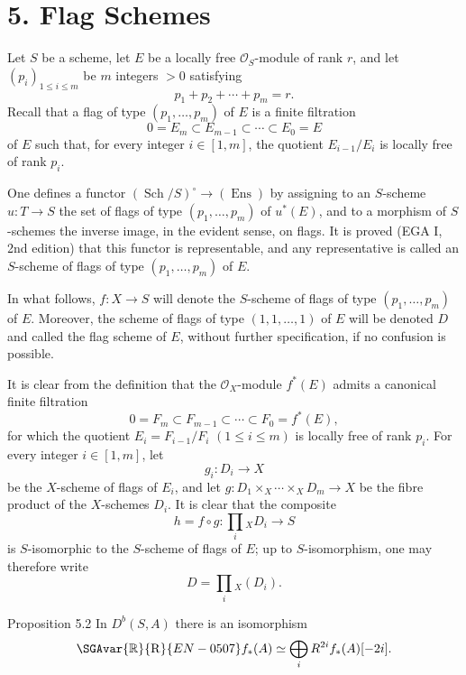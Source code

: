 \section*{5. Flag Schemes}

Let $S$ be a scheme, let $E$ be a locally free $\mathcal O_S$-module of rank $r$, and let $(p_i)_{1\le i\le m}$ be $m$ integers $>0$ satisfying
\[
p_1+p_2+\cdots+p_m=r.
\]
Recall that a flag of type $(p_1,\ldots,p_m)$ of $E$ is a finite filtration
\[
0=E_m\subset E_{m-1}\subset\cdots\subset E_0=E
\]
of $E$ such that, for every integer $i\in[1,m]$, the quotient $E_{i-1}/E_i$ is locally free of rank $p_i$.

One defines a functor $(\operatorname{Sch}/S)^\circ\to(\operatorname{Ens})$ by assigning to an $S$-scheme $u:T\to S$ the set of flags of type $(p_1,\ldots,p_m)$ of $u^*(E)$, and to a morphism of $S$-schemes the inverse image, in the evident sense, on flags. It is proved (EGA I, 2nd edition) that this functor is representable, and any representative is called an $S$-scheme of flags of type $(p_1,\ldots,p_m)$ of $E$.

In what follows, $f:X\to S$ will denote the $S$-scheme of flags of type $(p_1,\ldots,p_m)$ of $E$. Moreover, the scheme of flags of type $(1,1,\ldots,1)$ of $E$ will be denoted $D$ and called the flag scheme of $E$, without further specification, if no confusion is possible.

It is clear from the definition that the $\mathcal O_X$-module $f^*(E)$ admits a canonical finite filtration
\[
0=F_m\subset F_{m-1}\subset\cdots\subset F_0=f^*(E),
\]
for which the quotient $E_i=F_{i-1}/F_i$ $(1\le i\le m)$ is locally free of rank $p_i$. For every integer $i\in[1,m]$, let
\[
g_i:D_i\to X
\]
be the $X$-scheme of flags of $E_i$, and let $g:D_1\times_X\cdots\times_X D_m\to X$ be the fibre product of the $X$-schemes $D_i$. It is clear that the composite
\[
h=f\circ g:\prod_i{}_XD_i\to S
\tag{5.1}
\]
is $S$-isomorphic to the $S$-scheme of flags of $E$; up to $S$-isomorphism, one may therefore write
\[
D=\prod_i{}_X(D_i).
\]

\begin{statement}{Proposition 5.2}
In $D^b(S,A)$ there is an isomorphism
\[
\SGAvar{\mathbb{R}}{\mathrm R}{EN-0507}f_*(A)\simeq\bigoplus_i R^{2i}f_*(A)[-2i].
\]
\end{statement}

